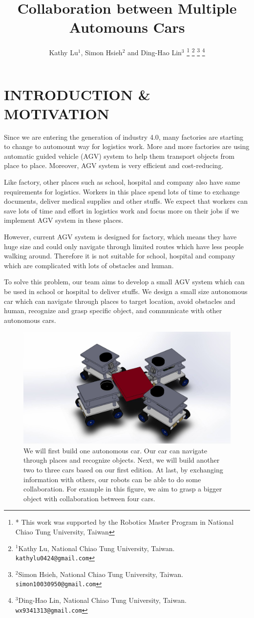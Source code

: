 \documentclass[a4paper, 10pt, conference]{ieeeconf}      %
\title{\LARGE \bf
Collaboration between Multiple Automouns Cars
}
\author{Kathy Lu$^{1}$, Simon Hsieh$^{2}$ and Ding-Hao Lin$^{3}$%
\thanks{* This work was supported by the Robotics Master Program in National Chiao Tung University, Taiwan}%
\thanks{$^{1}$Kathy Lu, National Chiao Tung University, Taiwan.
        {\tt\small kathylu0424@gmail.com}}%
\thanks{$^{2}$Simon Hsieh, National Chiao Tung University, Taiwan.
        {\tt\small simon10030950@gmail.com}}%
\thanks{$^{3}$Ding-Hao Lin, National Chiao Tung University, Taiwan.
        {\tt\small wx9341313@gmail.com}}%
}
\begin{document}
\maketitle
\thispagestyle{empty}
\pagestyle{empty}

\section{INTRODUCTION \& MOTIVATION}

Since we are entering the generation of industry 4.0, many factories are starting to change to automount way for logistics work. More and more factories are using automatic guided vehicle (AGV) system to help them transport objects from place to place. Moreover, AGV system is very efficient and cost-reducing.

Like factory, other places such as school, hospital and company also have same requirements for logistics. Workers in this place spend lots of time to exchange documents, deliver medical supplies and other stuffs. We expect that workers can save lots of time and effort in logistics work and focus more on their jobs if we implement AGV system in these places. 

However, current AGV system is designed for factory, which means they have huge size and could only navigate through limited routes which have less people walking around. Therefore it is not suitable for school, hospital and company which are complicated with lots of obstacles and human. 

To solve this problem, our team aims to develop a small AGV system which can be used in school or hospital to deliver stuffs. We design a small size autonomous car which can navigate through places to target location, avoid obstacles and human, recognize and grasp specific object, and communicate with other autonomous cars.

\begin{figure}[t]
\includegraphics[width=0.95\columnwidth]{Teaser}
\centering
\caption{We will first build one autonomous car. Our car can navigate through places and recognize objects. Next, we will build another two to three cars based on our first edition. At last, by exchanging information with others, our robots can be able to do some collaboration. For example in this figure, we aim to grasp a bigger object with collaboration between four cars.}
\end{figure}
\end{document}
